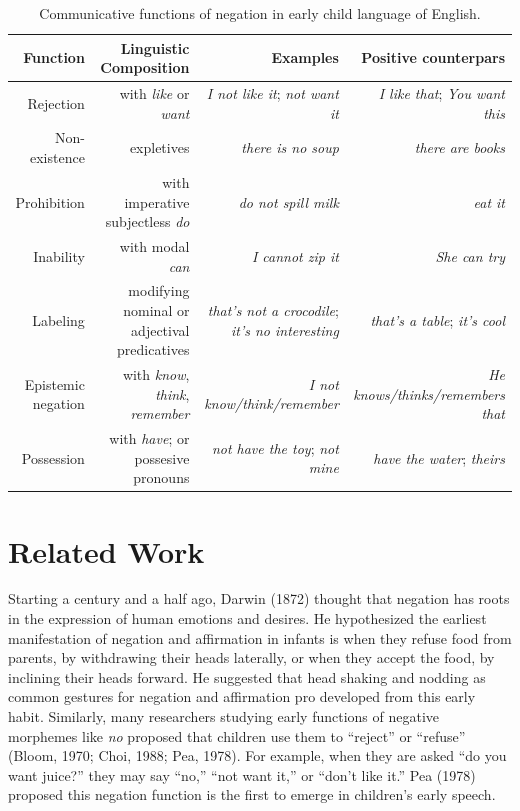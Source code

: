 \documentclass[
  english,
  man,floatsintext]{apa6}
\begin{document}
\begin{table}[h]
\small
\centering
\begin{tabular}{rrrr}
  \hline
 \textbf{Function} & \textbf{Linguistic Composition} & \textbf{Examples} & \textbf{Positive counterpars} \\
  \hline
Rejection & with \textit{like} or \textit{want} & \textit{I not like it}; \textit{not want it}  & \textit{I like that}; \textit{You want this} \\
Non-existence & expletives & \textit{there is no soup} & \textit{there are books} \\
Prohibition & with imperative subjectless \textit{do} & \textit{do not spill milk} & \textit{eat it} \\
Inability & with modal \textit{can} & \textit{I cannot zip it} & \textit{She can try} \\
Labeling & modifying nominal or adjectival predicatives & \textit{that's not a crocodile}; \textit{it's no interesting} & \textit{that's a table}; \textit{it's cool} \\
Epistemic negation & with \textit{know}, \textit{think}, \textit{remember}  & \textit{I not know/think/remember} & \textit{He knows/thinks/remembers that} \\
Possession & with \textit{have}; or possesive pronouns & \textit{not have the toy}; \textit{not mine} & \textit{have the water}; \textit{theirs} \\
   \hline
\end{tabular}
\caption{Communicative functions of negation in early child language of English.}
\end{table}

\hypertarget{related-work}{%
\section{Related Work}\label{related-work}}

Starting a century and a half ago, Darwin (1872) thought that negation has roots in the expression of human emotions and desires. He hypothesized the earliest manifestation of negation and affirmation in infants is when they refuse food from parents, by withdrawing their heads laterally, or when they accept the food, by inclining their heads forward. He suggested that head shaking and nodding as common gestures for negation and affirmation pro developed from this early habit. Similarly, many researchers studying early functions of negative morphemes like \emph{no} proposed that children use them to ``reject'' or ``refuse'' (Bloom, 1970; Choi, 1988; Pea, 1978). For example, when they are asked ``do you want juice?'' they may say ``no,'' ``not want it,'' or ``don't like it.'' Pea (1978) proposed this negation function is the first to emerge in children's early speech.
\end{document}
